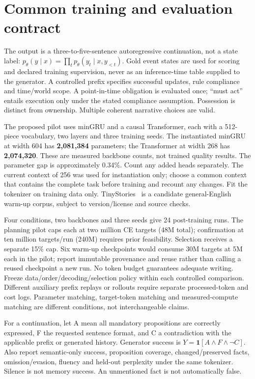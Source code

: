 \section{Common training and evaluation contract}
The output is a three-to-five-sentence autoregressive continuation, not a state
label: \(p_\theta(y\mid x)=\prod_t p_\theta(y_t\mid x,y_{<t})\). Gold event states
are used for scoring and declared training supervision, never as an inference-time
table supplied to the generator. A controlled prefix specifies successful updates,
rule compliance and time/world scope. A point-in-time obligation is evaluated once;
``must act'' entails execution only under the stated compliance assumption.
Possession is distinct from ownership. Multiple coherent narrative choices are valid.

The proposed pilot uses minGRU and a causal Transformer, each with a 512-piece
vocabulary, two layers and three training seeds. The instantiated minGRU at width
604 has \textbf{2,081,384} parameters; the Transformer at width 268 has
\textbf{2,074,320}. These are measured backbone counts, not trained quality results.
The parameter gap is approximately 0.34\%. Count any added heads separately.
The current context of 256 was used for instantiation only; choose a common
context that contains the complete task before training and recount any changes.
Fit the tokenizer on training data only. TinyStories~\cite{tiny} is a candidate
general-English warm-up corpus, subject to version/license and source checks.

Four conditions, two backbones and three seeds give 24 post-training runs. The
planning pilot caps each at two million CE targets (48M total); confirmation at
ten million targets/run (240M) requires prior feasibility. Selection receives a
separate 15\% cap. Six warm-up checkpoints would consume 30M targets at 5M each
in the pilot; report immutable provenance and reuse rather than calling a reused
checkpoint a new run. No token budget guarantees adequate writing. Freeze
data/order/decoding/selection policy within each controlled comparison. Different
auxiliary prefix replays or rollouts require separate processed-token and cost logs.
Parameter matching, target-token matching and measured-compute matching are
different conditions, not interchangeable claims.

For a continuation, let A mean all mandatory propositions are correctly expressed,
F the requested sentence format, and C a contradiction with the applicable prefix
or generated history. Generator success is \(Y=\mathbf1[A\land F\land\neg C]\).
Also report semantic-only success, proposition coverage, changed/preserved facts,
omission/evasion, fluency and held-out perplexity under the same tokenizer.
Silence is not memory success. An unmentioned fact is not automatically false.

